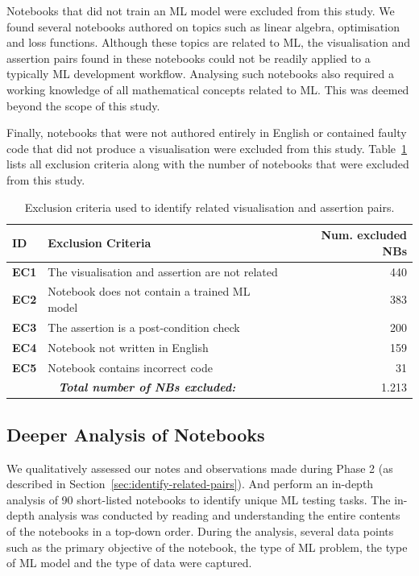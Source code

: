 \documentclass[conference]{IEEEtran}
\begin{document}
Notebooks that did not train an ML model were excluded from this study. We found several notebooks authored on topics such as linear algebra, optimisation and loss functions. Although these topics are related to ML, the visualisation and assertion pairs found in these notebooks could not be readily applied to a typically ML development workflow. Analysing such notebooks also required a working knowledge of all mathematical concepts related to ML. This was deemed beyond the scope of this study.

Finally, notebooks that were not authored entirely in English or contained faulty code that did not produce a visualisation were excluded from this study. Table~\ref{tab:exclusion-criteria} lists all exclusion criteria along with the number of notebooks that were excluded from this study.

\begin{table}
  \centering
  \caption{Exclusion criteria used to identify related visualisation and assertion pairs.}
  \begin{tabular}{l p{} r}
    \hline
    \textbf{ID} &
    \textbf{Exclusion Criteria} &
    \textbf{Num. excluded NBs}\\
    \hline
    \textbf{EC1} &
    The visualisation and assertion are not related &
    440\\
    \textbf{EC2} &
    Notebook does not contain a trained ML model &
    383\\
    \textbf{EC3} &
    The assertion is a post-condition check &
    200\\
    \textbf{EC4} &
    Notebook not written in English &
    159\\
    \textbf{EC5} &
    Notebook contains incorrect code &
    31\\
    \hline
    \multicolumn{2}{c}{\emph{\textbf{Total number of NBs excluded:}}} &
    1.213\\
    \hline
  \end{tabular}
  \label{tab:exclusion-criteria}
\end{table}

\subsection{Deeper Analysis of Notebooks}\label{sec:deep-dive}

We qualitatively assessed our notes and observations made during Phase 2 (as described in Section~\ref{sec:identify-related-pairs}). And perform an in-depth analysis of 90 short-listed notebooks to identify unique ML testing tasks. The in-depth analysis was conducted by reading and understanding the entire contents of the notebooks in a top-down order. During the analysis, several data points such as the primary objective of the notebook, the type of ML problem, the type of ML model and the type of data were captured.
\end{document}
